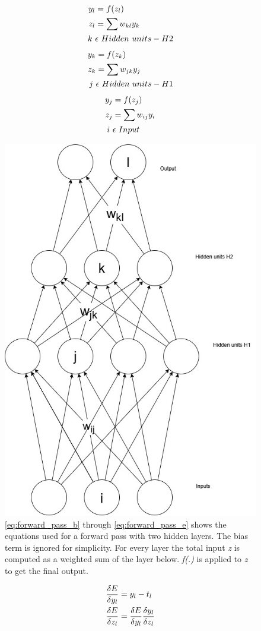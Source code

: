 \begin{align}
    \label{eq:forward_pass_b}
    y_l &= f(z_l) \\
    z_l &= \sum w_{kl} y_k \notag\\
    k\  &\epsilon\ Hidden\ units-H2 \notag
\end{align}
\begin{align}
    y_k &= f(z_k) \\
    z_k &= \sum w_{jk} y_j \notag\\
    j\  &\epsilon\ Hidden\ units-H1 \notag
\end{align}
\begin{align}
    \label{eq:forward_pass_e}
    y_j &= f(z_j) \\
    z_j &= \sum w_{ij} y_i \notag\\
    i\  &\epsilon\ Input \notag
\end{align}
    
\begin{figure}
    \centering
    \includegraphics[width=0.5\linewidth]{figures/neural_net.jpg}
    \caption{\autoref{eq:forward_pass_b} through \autoref{eq:forward_pass_e} shows the equations used for a forward pass with two hidden layers. The bias term is ignored for simplicity. For every layer the total input \textit{z} is computed as a weighted sum of the layer below. \textit{f(.)} is applied to \textit{z} to get the final output.}
    \label{fig:multilayer_neural_net}
\end{figure}


\begin{align}
    \label{eq:backward_pass_b}
    \frac{\delta E}{\delta y_l} &= y_l-t_l \\
    \frac{\delta E}{\delta z_l} &= \frac{\delta E}{\delta y_l} \frac{\delta y_l}{\delta z_l} \notag
\end{align}


